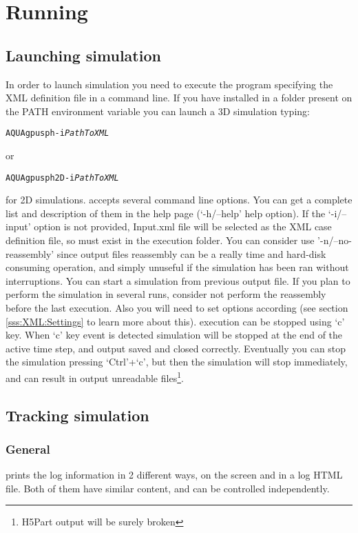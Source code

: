 \chapter{Running \NAME}
\label{s:running}
%
\section{Launching simulation}
\label{ss:running:launching}
%
In order to launch \NAME simulation you need to execute the program
specifying the XML definition file in a command line. If you have
installed \NAME in a folder present on the PATH environment variable
you can launch a 3D simulation typing:
%
\begin{alltt}
AQUAgpusph -i \emph{PathToXML}
\end{alltt}
%
or
%
\begin{alltt}
AQUAgpusph2D -i \emph{PathToXML}
\end{alltt}
%
for 2D simulations.\rc
%
\NAME accepts several command line options. You can get a complete list
and description of them in the help page (`-h/--help' help option). If
the `-i/--input' option is not provided, Input.xml file will be selected
as the XML case definition file, so must exist in the execution folder.
You can consider use '-n/--no-reassembly' since output files reassembly
can be a really time and hard-disk consuming operation, and simply
unuseful if the simulation has been ran without interruptions.\rc
%
You can start a simulation from previous output file. If you plan to perform
the simulation in several runs, consider not perform the reassembly before
the last execution. Also you will need to set options according (see section
\ref{sss:XML:Settings} to learn more about this).\rc
%
\NAME execution can be stopped using `c' key. When `c' key event is detected
simulation will be stopped at the end of the active time step, and output
saved and closed correctly.\rc
%
Eventually you can stop the simulation pressing `Ctrl'+`c', but then the
simulation will stop immediately, and can result in output unreadable
files\footnote{H5Part output will be surely broken}.
%
\section{Tracking simulation}
\label{ss:running:tracking}
%
\subsection{General}
%
\NAME prints the log information in 2 different ways, on the screen and in a
log HTML file. Both of them have similar content, and can be controlled
independently.\rc
%

